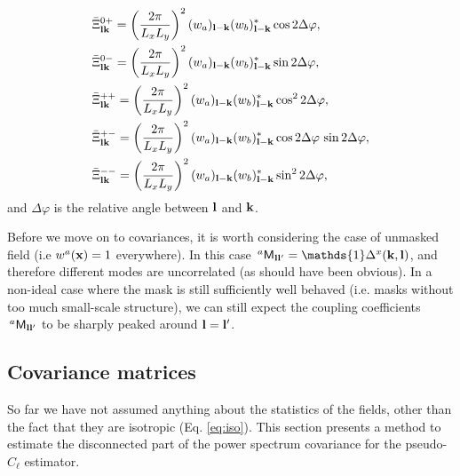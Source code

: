 \documentclass[a4paper,11pt]{article}
\begin{document}
\begin{itemize}
\begin{align}
          &\bar{\Xi}^{0+}_{{\bf l}{\bf k}}=\left(\frac{2\pi}{L_xL_y}\right)^2 (w_a)_{{\bf l}-{\bf k}}(w_b)^*_{{\bf l}-{\bf k}}\cos2\Delta\varphi,\\
          &\bar{\Xi}^{0-}_{{\bf l}{\bf k}}=\left(\frac{2\pi}{L_xL_y}\right)^2 (w_a)_{{\bf l}-{\bf k}}(w_b)^*_{{\bf l}-{\bf k}}\sin2\Delta\varphi,\\
          &\bar{\Xi}^{++}_{{\bf l}{\bf k}}=\left(\frac{2\pi}{L_xL_y}\right)^2 (w_a)_{{\bf l}-{\bf k}}(w_b)^*_{{\bf l}-{\bf k}}\cos^22\Delta\varphi,\\
          &\bar{\Xi}^{+-}_{{\bf l}{\bf k}}=\left(\frac{2\pi}{L_xL_y}\right)^2 (w_a)_{{\bf l}-{\bf k}}(w_b)^*_{{\bf l}-{\bf k}}\cos2\Delta\varphi\,\sin2\Delta\varphi,\\
          &\bar{\Xi}^{--}_{{\bf l}{\bf k}}=\left(\frac{2\pi}{L_xL_y}\right)^2 (w_a)_{{\bf l}-{\bf k}}(w_b)^*_{{\bf l}-{\bf k}}\sin^22\Delta\varphi,
        \end{align}
        and $\Delta\varphi$ is the relative angle between ${\bf l}$ and ${\bf k}$.
      \end{itemize}

      Before we move on to covariances, it is worth considering the case of unmasked field (i.e $w^a({\bf x})=1$ everywhere). In this case $\,^a{\sf M}_{{\bf l}{\bf l}'}=\mathds{1}\Delta^x({\bf k},{\bf l})$, and therefore different modes are uncorrelated (as should have been obvious). In a non-ideal case where the mask is still sufficiently well behaved (i.e. masks without too much small-scale structure), we can still expect the coupling coefficients $\,^a{\sf M}_{{\bf l}{\bf l}'}$ to be sharply peaked around ${\bf l}={\bf l}'$.
  
    \subsection{Covariance matrices}\label{ssec:theory.pclcov}
      So far we have not assumed anything about the statistics of the fields, other than the fact that they are isotropic (Eq. \ref{eq:iso}). This section presents a method to estimate the disconnected part of the power spectrum covariance for the pseudo-$C_\ell$ estimator.
    
\end{document}
